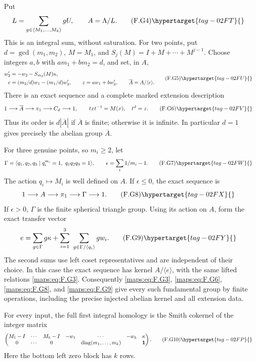 \begin{theorem}
Put
\[
 L=\sum_{g\in\langle M_1,\ldots,M_k\rangle}gU,
 \qquad A=\Lambda/L.                                      \tag{F.G4}\hypertarget{tag-02FT}{}\label{maps:eq:F.G4}
\]
This is an integral sum, without saturation.  For two points, put
$d=\gcd(m_1,m_2)$, $M=M_1$, and
$S_j(M)=I+M+\cdots+M^{j-1}$.  Choose integers $a,b$ with
$am_1+bm_2=d$, and set, in $A$,
\[
 \begin{split}
 w'_2&=-w_2-S_{m_2}(M)\kappa,\\
 e&=(m_2/d)w_1-(m_1/d)w'_2,\qquad
 z=aw_1+bw'_2,\qquad \overline A=A/\langle e\rangle .
 \end{split}                                             \tag{F.G5}\hypertarget{tag-02FU}{}\label{maps:eq:F.G5}
\]
There is an exact sequence and a complete marked extension description
\[
 1\longrightarrow\overline A\longrightarrow\pi_1
   \longrightarrow C_d\longrightarrow1,
 \qquad txt^{-1}=M(x),\quad t^d=z.                         \tag{F.G6}\hypertarget{tag-02FV}{}\label{maps:eq:F.G6}
\]
Thus its order is $d|\overline A|$ if $\overline A$ is finite;
otherwise it is infinite.  In particular $d=1$ gives precisely
the abelian group $\overline A$.

For three genuine points, so $m_i\ge2$, let
\[
 \Gamma=\langle q_1,q_2,q_3\mid q_i^{m_i}=1,
                         \ q_1q_2q_3=1\rangle,
 \qquad \epsilon=\sum_i1/m_i-1.                           \tag{F.G7}\hypertarget{tag-02FW}{}\label{maps:eq:F.G7}
\]
The action $q_i\mapsto M_i$ is well defined on $A$.
If $\epsilon\le0$, the exact sequence is
\[
                    1\longrightarrow A\longrightarrow\pi_1
                         \longrightarrow\Gamma\longrightarrow1. 
 \tag{F.G8}\hypertarget{tag-02FX}{}\label{maps:eq:F.G8}
\]
If $\epsilon>0$, $\Gamma$ is the finite spherical triangle group.
Using its action on $A$, form the exact transfer vector
\[
 e=\sum_{g\in\Gamma}g\kappa+
       \sum_{i=1}^3\ \sum_{g\in\Gamma/\langle q_i\rangle}g w_i.
 \tag{F.G9}\hypertarget{tag-02FY}{}\label{maps:eq:F.G9}
\]
The second sums use left coset representatives and are independent
of their choice.  In this case the exact sequence has kernel
$A/\langle e\rangle$, with the same lifted relations \eqref{maps:eq:F.G3}.
Consequently \eqref{maps:eq:F.G3}, \eqref{maps:eq:F.G6}, \eqref{maps:eq:F.G8}, and \eqref{maps:eq:F.G9} give every such fundamental group by finite operations, including the precise
injected abelian kernel and all extension data.

For every input, the full first integral homology is the Smith
cokernel of the integer matrix
\[
 \begin{pmatrix}
 M_1-I&\cdots&M_k-I&-w_1&\cdots&-w_k&\kappa\\
 0&\cdots&0&&\operatorname{diag}(m_1,\ldots,m_k)&&\boldsymbol1
 \end{pmatrix}.                                           \tag{F.G10}\hypertarget{tag-02FP}{}\label{maps:eq:F.G10}
\]
Here the bottom left zero block has $k$ rows.

\end{theorem}


